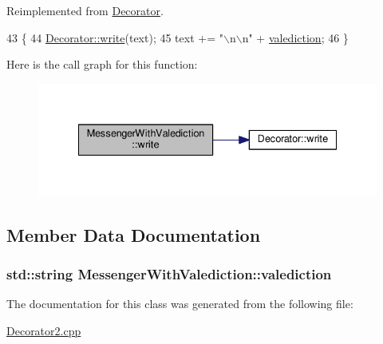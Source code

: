 Reimplemented from \hyperlink{classDecorator_ae5cad6daee450fb5eaa2b1cad6a0dd45}{Decorator}.


\begin{DoxyCode}
43                                                       \{
44             \hyperlink{classDecorator_ae5cad6daee450fb5eaa2b1cad6a0dd45}{Decorator::write}(text);
45             text += \textcolor{stringliteral}{"\(\backslash\)n\(\backslash\)n"} + \hyperlink{classMessengerWithValediction_ad8c759fc057a3b7d2331ec6a84a38895}{valediction};
46         \}
\end{DoxyCode}


Here is the call graph for this function\+:
\nopagebreak
\begin{figure}[H]
\begin{center}
\leavevmode
\includegraphics[width=335pt]{classMessengerWithValediction_a93f7e5fc32a11b58b3c57b54544ec8a2_cgraph}
\end{center}
\end{figure}




\subsection{Member Data Documentation}
\subsubsection[{\texorpdfstring{valediction}{valediction}}]{\setlength{\rightskip}{0pt plus 5cm}std\+::string Messenger\+With\+Valediction\+::valediction\hspace{0.3cm}{\ttfamily [private]}}\hypertarget{classMessengerWithValediction_ad8c759fc057a3b7d2331ec6a84a38895}{}\label{classMessengerWithValediction_ad8c759fc057a3b7d2331ec6a84a38895}


The documentation for this class was generated from the following file\+:\begin{DoxyCompactItemize}
\item 
\hyperlink{Decorator2_8cpp}{Decorator2.\+cpp}\end{DoxyCompactItemize}
